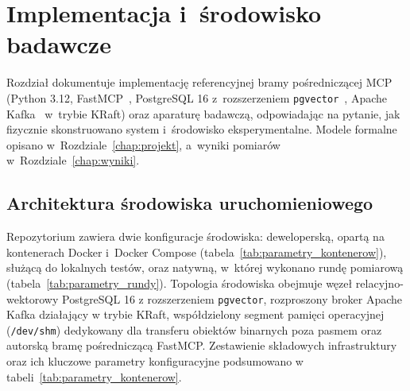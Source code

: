 \chapter{Implementacja i~środowisko badawcze}
\label{chap:implementacja}

Rozdział dokumentuje implementację referencyjnej bramy pośredniczącej MCP~\cite{mcp_spec} (Python 3.12, FastMCP~\cite{fastmcp}, PostgreSQL 16 z~rozszerzeniem \texttt{pgvector}~\cite{pgvector}, Apache Kafka~\cite{kreps2011kafka} w~trybie KRaft) oraz aparaturę badawczą, odpowiadając na pytanie, jak fizycznie skonstruowano system i~środowisko eksperymentalne. Modele formalne opisano w~Rozdziale~\ref{chap:projekt}, a~wyniki pomiarów w~Rozdziale~\ref{chap:wyniki}.


\section{Architektura środowiska uruchomieniowego}
\label{sec:architektura_srodowiska}

Repozytorium zawiera dwie konfiguracje środowiska: deweloperską, opartą na kontenerach Docker i~Docker Compose (tabela~\ref{tab:parametry_kontenerow}), służącą do lokalnych testów, oraz natywną, w~której wykonano rundę pomiarową (tabela~\ref{tab:parametry_rundy}). Topologia środowiska obejmuje węzeł relacyjno-wektorowy PostgreSQL 16 z rozszerzeniem \texttt{pgvector}, rozproszony broker Apache Kafka działający w trybie KRaft, współdzielony segment pamięci operacyjnej (\texttt{/dev/shm}) dedykowany dla transferu obiektów binarnych poza pasmem oraz autorską bramę pośredniczącą FastMCP. Zestawienie składowych infrastruktury oraz ich kluczowe parametry konfiguracyjne podsumowano w tabeli~\ref{tab:parametry_kontenerow}.

